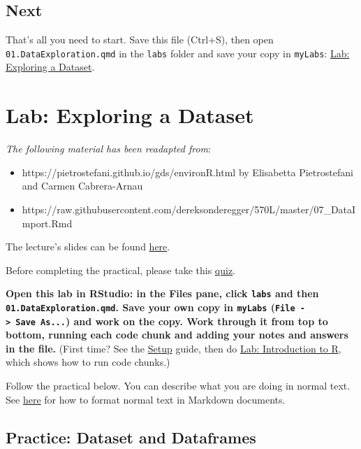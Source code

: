 \documentclass[
  letterpaper,
  DIV=11,
  numbers=noendperiod]{scrreprt}
\providecommand{\tightlist}{%
  \setlength{\itemsep}{0pt}\setlength{\parskip}{0pt}}
\begin{document}
\section{Next}\label{next}

That's all you need to start. Save this file (Ctrl+S), then open
\texttt{01.DataExploration.qmd} in the \texttt{labs} folder and save
your copy in \texttt{myLabs}: \href{01.DataExploration.qmd}{Lab:
Exploring a Dataset}.


\chapter{Lab: Exploring a Dataset}\label{lab-exploring-a-dataset}

\emph{The following material has been readapted from}:

\begin{itemize}
\tightlist
\item
  https://pietrostefani.github.io/gds/environR.html by Elisabetta
  Pietrostefani and Carmen Cabrera-Arnau
\item
  https://raw.githubusercontent.com/dereksonderegger/570L/master/07\_DataImport.Rmd
\end{itemize}

The lecture's slides can be found
\href{https://github.com/GDSL-UL/stats/blob/main/lectures/lecture01.pdf}{here}.

Before completing the practical, please take this
\href{https://canvas.liverpool.ac.uk/courses/93312/quizzes/176545}{quiz}.

\textbf{Open this lab in RStudio: in the Files pane, click \texttt{labs}
and then \texttt{01.DataExploration.qmd}. Save your own copy in
\texttt{myLabs} (\texttt{File\ -\textgreater{}\ Save\ As...}) and work
on the copy. Work through it from top to bottom, running each code chunk
and adding your notes and answers in the file.} (First time? See the
\hyperref[setup-rstudio-in-your-browser]{Setup} guide, then do
\hyperref[lab-introduction-to-r]{Lab: Introduction to R}, which shows
how to run code chunks.)

Follow the practical below. You can describe what you are doing in
normal text. See
\href{https://quarto.org/docs/authoring/markdown-basics.html}{here} for
how to format normal text in Markdown documents.

\section{Practice: Dataset and
Dataframes}\label{practice-dataset-and-dataframes}
\end{document}
